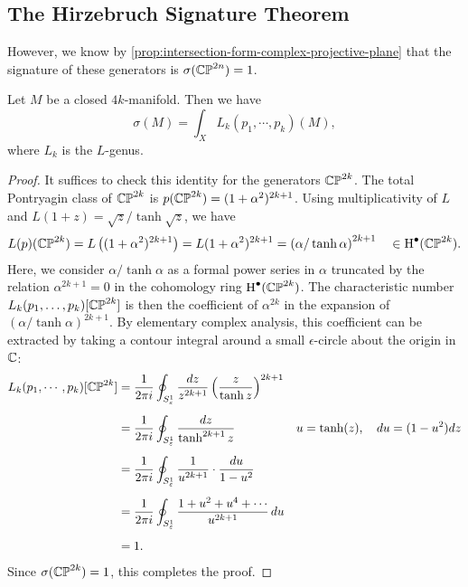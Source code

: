 \subsection{The Hirzebruch Signature Theorem}

However, we know by \cref{prop:intersection-form-complex-projective-plane} that the signature of these generators is $\sigma(\mathbb{CP}^{2n})=1$.

\begin{theorem}[Hirzebruch]\label{thm:hirzebruch-signature-theorem}
	Let $M$ be a closed $4k$-manifold. Then we have
	\[
		\sigma(M) = \int_X L_k(p_1, \cdots, p_k)(M),
	\]
	where $L_k$ is the $L$-genus.
\end{theorem}
\begin{proof}
	It suffices to check this identity for the generators $\mathbb{CP}^{2k}$. The total Pontryagin class of $\mathbb{CP}^{2k}$ is $p(\mathbb{CP}^{2k})=(1+\alpha^2)^{2k+1}$. Using multiplicativity of $L$ and $L(1+z)=\sqrt{z}/\tanh\sqrt{z}$, we have
	\[
		\begin{aligned}
			L(p)(\mathbb{CP}^{2k})
			= L\left((1+\alpha^2)^{2k+1}\right)
			= L(1+\alpha^2)^{2k+1}
			= \left(\alpha/\tanh \alpha\right)^{2k+1}
			\quad\in\operatorname{H}^\bullet(\mathbb{CP}^{2k}).
		\end{aligned}
	\]
	Here, we consider $\alpha/\tanh \alpha$ as a formal power series in $\alpha$ truncated by the relation $\alpha^{2k+1}=0$ in the cohomology ring $\operatorname{H}^\bullet(\mathbb{CP}^{2k})$. The characteristic number $L_k(p_1,\ldots,p_k)[\mathbb{CP}^{2k}]$ is then the coefficient of $\alpha^{2k}$ in the expansion of $(\alpha/\tanh \alpha)^{2k+1}$.
	By elementary complex analysis, this coefficient can be extracted by taking a contour integral around a small $\epsilon$-circle about the origin in $\mathbb{C}$:
	\[
		\begin{aligned}
			L_k(p_1,\cdots, p_k)[\mathbb{CP}^{2k}]
			 & = \frac{1}{2\pi i}\oint_{S^1_\varepsilon} \frac{dz}{z^{2k+1}} \left(\frac{z}{\tanh z}\right)^{2k+1}
			 &                                                                                                    \\[0.5em]
			 & = \frac{1}{2\pi i}\oint_{S^1_\varepsilon} \frac{dz}{\tanh^{2k+1} z}\quad
			 & u  =\tanh(z),\quad
			du =(1-u^2)dz
			\\[0.5em]
			 & = \frac{1}{2\pi i}\oint_{S^1_\varepsilon} \frac{1}{u^{2k+1}}\cdot\frac{du}{1-u^2}
			 &                                                                                                    \\[0.5em]
			 & = \frac{1}{2\pi i}\oint_{S^1_\varepsilon} \frac{1+u^2+u^4+\cdots}{u^{2k+1}}\,du                       \\[0.5em]
			 & =1.                                                                                              &
		\end{aligned}
	\]
	Since $\sigma(\mathbb{CP}^{2k})=1$, this completes the proof.
\end{proof}

